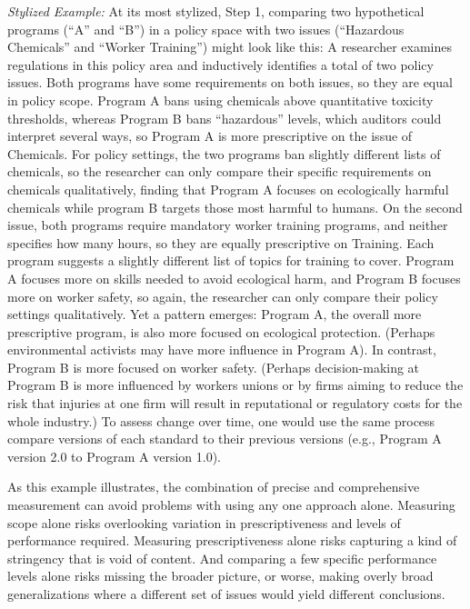 \documentclass[
      12pt,
            Review ]{article}
\begin{document}
\emph{Stylized Example:} At its most stylized, Step 1, comparing two hypothetical programs (``A'' and ``B'') in a policy space with two issues (``Hazardous Chemicals'' and ``Worker Training'') might look like this: A researcher examines regulations in this policy area and inductively identifies a total of two policy issues. Both programs have some requirements on both issues, so they are equal in policy scope. Program A bans using chemicals above quantitative toxicity thresholds, whereas Program B bans ``hazardous'' levels, which auditors could interpret several ways, so Program A is more prescriptive on the issue of Chemicals. For policy settings, the two programs ban slightly different lists of chemicals, so the researcher can only compare their specific requirements on chemicals qualitatively, finding that Program A focuses on ecologically harmful chemicals while program B targets those most harmful to humans. On the second issue, both programs require mandatory worker training programs, and neither specifies how many hours, so they are equally prescriptive on Training. Each program suggests a slightly different list of topics for training to cover. Program A focuses more on skills needed to avoid ecological harm, and Program B focuses more on worker safety, so again, the researcher can only compare their policy settings qualitatively. Yet a pattern emerges: Program A, the overall more prescriptive program, is also more focused on ecological protection. (Perhaps environmental activists may have more influence in Program A). In contrast, Program B is more focused on worker safety. (Perhaps decision-making at Program B is more influenced by workers unions or by firms aiming to reduce the risk that injuries at one firm will result in reputational or regulatory costs for the whole industry.) To assess change over time, one would use the same process compare versions of each standard to their previous versions (e.g., Program A version 2.0 to Program A version 1.0).

As this example illustrates, the combination of precise and comprehensive measurement can avoid problems with using any one approach alone. Measuring scope alone risks overlooking variation in prescriptiveness and levels of performance required. Measuring prescriptiveness alone risks capturing a kind of stringency that is void of content. And comparing a few specific performance levels alone risks missing the broader picture, or worse, making overly broad generalizations where a different set of issues would yield different conclusions.
\end{document}

